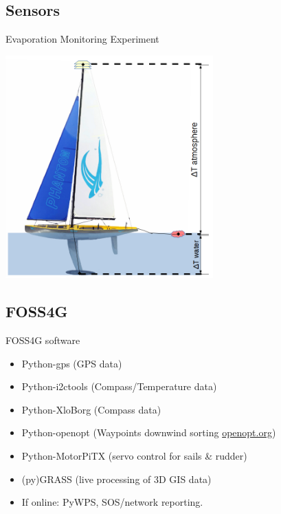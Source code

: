 \documentclass[xcolor=dvipsnames,beamer]{beamer} %
\begin{document}
\subsection{Sensors}
\begin{frame}[fragile]{Evaporation Monitoring Experiment}

\begin{center}
 \includegraphics[width=8cm]{amitomiv1}
\end{center}

\end{frame}


\subsection{FOSS4G}
\begin{frame}[fragile]{FOSS4G software}

\begin{itemize}
 \item Python-gps (GPS data)
 \item Python-i2ctools (Compass/Temperature data)
 \item Python-XloBorg (Compass data)
 \item Python-openopt (Waypoints downwind sorting \href{htp://openopt.org}{openopt.org})
 \item Python-MotorPiTX (servo control for sails \& rudder)
 \item (py)GRASS (live processing of 3D GIS data)
 \item If online: PyWPS, SOS/network reporting. 
\end{itemize}

\end{frame}
\end{document}
